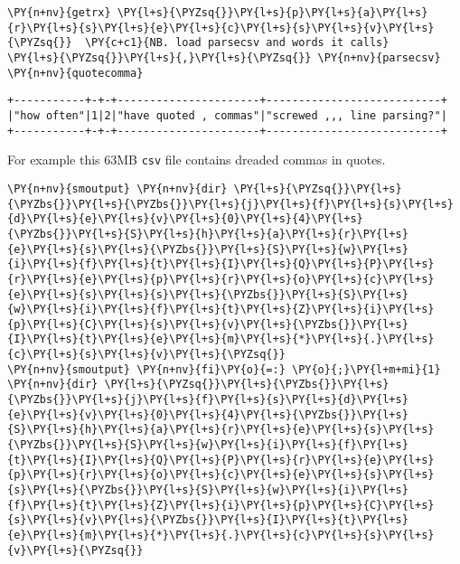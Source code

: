     \begin{tcolorbox}[breakable, size=fbox, boxrule=1pt, pad at break*=1mm,colback=cellbackground, colframe=cellborder]
\begin{Verbatim}[commandchars=\\\{\}]
\PY{n+nv}{getrx} \PY{l+s}{\PYZsq{}}\PY{l+s}{p}\PY{l+s}{a}\PY{l+s}{r}\PY{l+s}{s}\PY{l+s}{e}\PY{l+s}{c}\PY{l+s}{s}\PY{l+s}{v}\PY{l+s}{\PYZsq{}}  \PY{c+c1}{NB. load parsecsv and words it calls}
\PY{l+s}{\PYZsq{}}\PY{l+s}{,}\PY{l+s}{\PYZsq{}} \PY{n+nv}{parsecsv} \PY{n+nv}{quotecomma}
\end{Verbatim}
\end{tcolorbox}

    \begin{Verbatim}[commandchars=\\\{\}]
+-----------+-+-+----------------------+---------------------------+
|"how often"|1|2|"have quoted , commas"|"screwed ,,, line parsing?"|
+-----------+-+-+----------------------+---------------------------+
    \end{Verbatim}

    For example this 63MB \texttt{csv} file contains dreaded commas in
quotes.

    \begin{tcolorbox}[breakable, size=fbox, boxrule=1pt, pad at break*=1mm,colback=cellbackground, colframe=cellborder]
\begin{Verbatim}[commandchars=\\\{\}]
\PY{n+nv}{smoutput} \PY{n+nv}{dir} \PY{l+s}{\PYZsq{}}\PY{l+s}{\PYZbs{}}\PY{l+s}{\PYZbs{}}\PY{l+s}{j}\PY{l+s}{f}\PY{l+s}{s}\PY{l+s}{d}\PY{l+s}{e}\PY{l+s}{v}\PY{l+s}{0}\PY{l+s}{4}\PY{l+s}{\PYZbs{}}\PY{l+s}{S}\PY{l+s}{h}\PY{l+s}{a}\PY{l+s}{r}\PY{l+s}{e}\PY{l+s}{s}\PY{l+s}{\PYZbs{}}\PY{l+s}{S}\PY{l+s}{w}\PY{l+s}{i}\PY{l+s}{f}\PY{l+s}{t}\PY{l+s}{I}\PY{l+s}{Q}\PY{l+s}{P}\PY{l+s}{r}\PY{l+s}{e}\PY{l+s}{p}\PY{l+s}{r}\PY{l+s}{o}\PY{l+s}{c}\PY{l+s}{e}\PY{l+s}{s}\PY{l+s}{s}\PY{l+s}{\PYZbs{}}\PY{l+s}{S}\PY{l+s}{w}\PY{l+s}{i}\PY{l+s}{f}\PY{l+s}{t}\PY{l+s}{Z}\PY{l+s}{i}\PY{l+s}{p}\PY{l+s}{C}\PY{l+s}{s}\PY{l+s}{v}\PY{l+s}{\PYZbs{}}\PY{l+s}{I}\PY{l+s}{t}\PY{l+s}{e}\PY{l+s}{m}\PY{l+s}{*}\PY{l+s}{.}\PY{l+s}{c}\PY{l+s}{s}\PY{l+s}{v}\PY{l+s}{\PYZsq{}}
\PY{n+nv}{smoutput} \PY{n+nv}{fi}\PY{o}{=:} \PY{o}{;}\PY{l+m+mi}{1} \PY{n+nv}{dir} \PY{l+s}{\PYZsq{}}\PY{l+s}{\PYZbs{}}\PY{l+s}{\PYZbs{}}\PY{l+s}{j}\PY{l+s}{f}\PY{l+s}{s}\PY{l+s}{d}\PY{l+s}{e}\PY{l+s}{v}\PY{l+s}{0}\PY{l+s}{4}\PY{l+s}{\PYZbs{}}\PY{l+s}{S}\PY{l+s}{h}\PY{l+s}{a}\PY{l+s}{r}\PY{l+s}{e}\PY{l+s}{s}\PY{l+s}{\PYZbs{}}\PY{l+s}{S}\PY{l+s}{w}\PY{l+s}{i}\PY{l+s}{f}\PY{l+s}{t}\PY{l+s}{I}\PY{l+s}{Q}\PY{l+s}{P}\PY{l+s}{r}\PY{l+s}{e}\PY{l+s}{p}\PY{l+s}{r}\PY{l+s}{o}\PY{l+s}{c}\PY{l+s}{e}\PY{l+s}{s}\PY{l+s}{s}\PY{l+s}{\PYZbs{}}\PY{l+s}{S}\PY{l+s}{w}\PY{l+s}{i}\PY{l+s}{f}\PY{l+s}{t}\PY{l+s}{Z}\PY{l+s}{i}\PY{l+s}{p}\PY{l+s}{C}\PY{l+s}{s}\PY{l+s}{v}\PY{l+s}{\PYZbs{}}\PY{l+s}{I}\PY{l+s}{t}\PY{l+s}{e}\PY{l+s}{m}\PY{l+s}{*}\PY{l+s}{.}\PY{l+s}{c}\PY{l+s}{s}\PY{l+s}{v}\PY{l+s}{\PYZsq{}}
\end{Verbatim}
\end{tcolorbox}

